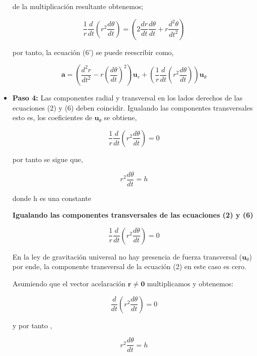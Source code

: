 \documentclass{article}
\begin{document}
\begin{itemize}
	de la multiplicación resultante obtenemos;
	
	\begin{equation*}
		\frac{1}{r} \frac{d}{dt} \left(r^2 \frac{d \theta}{dt} \right) = \left(2 \frac{dr}{dt} \frac{d \theta}{dt} + r \frac{d^2\theta}{dt^2} \right)
	\end{equation*}
	 
	 por tanto, la ecuación (6') se puede reescribir como,
	 
	 \begin{equation*}
	 		\mathbf{a} = \left(\frac{d^2r}{dt^2} - r \left(\frac{d \theta}{dt} \right)^2 \right) \mathbf{u}_r +  \left(\frac{1}{r} \frac{d}{dt} \left(r^2 \frac{d \theta}{dt} \right) \right) \mathbf{u}_\theta
	 \end{equation*}
	
	\item \textbf{Paso 4:} Las componentes radial y transversal en los lados derechos de las ecuaciones (2) y (6) deben coincidir. Igualando las componentes transversales esto es, los coeficientes de $\mathbf{u}_\theta$ se obtiene,
	
	\begin{equation}
		\frac{1}{r} \frac{d}{dt} \left( r^2 \frac{d \theta}{dt} \right) = 0
	\end{equation}
	
	por tanto se sigue que,
	
	\begin{equation}
		r^2 \frac{d \theta}{dt} = h
	\end{equation}
	
	donde h es una constante
	
	\textbf{Igualando las componentes transversales de las ecuaciones (2) y (6)}
	
	\begin{equation*}
		\frac{1}{r} \frac{d}{dt} \left(r^2 \frac{d \theta}{dt} \right) = 0
	\end{equation*}
	
	En la ley de gravitación universal no hay presencia de fuerza transversal ($\mathbf{u}_\theta$) por ende, la componente transversal de la ecuación (2) en este caso es cero.
	
	Asumiendo que el vector acelaración $\mathbf{r \neq 0}$ multiplicamos y obtenemos:
	
	\begin{equation*}
		\frac{d}{dt} \left(r^2 \frac{d \theta}{dt} \right) = 0
	\end{equation*}
	
	y por tanto ,
	
	\begin{equation*}
		r^2 \frac{d \theta}{dt} = h
	\end{equation*}
	\end{itemize}
	
\end{document}
